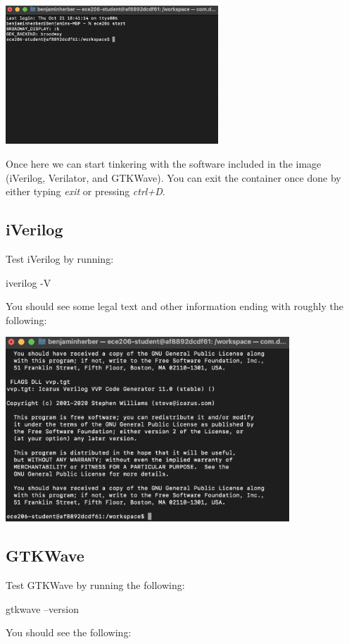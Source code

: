 \documentclass[11pt, letterpaper, titlepage, oneside]{memoir}
\begin{document}
        \begin{center}
            \includegraphics[width=0.6\textwidth]{./images/container_started.png}
        \end{center}
        
        Once here we can start tinkering with the software included in the image (iVerilog, Verilator, and GTKWave). You can exit the container once done by either typing \textit{exit} or pressing \textit{ctrl+D}.

        \subsection*{iVerilog}
            Test iVerilog by running:
            \begin{bash}
                iverilog -V
            \end{bash}
            You should see some legal text and other information ending with roughly the following:

            \begin{center}
                \includegraphics[width=0.8\textwidth]{./images/iverilog_confirmation.png}
            \end{center}

        \subsection*{GTKWave}
            Test GTKWave by running the following:
            \begin{bash}
                gtkwave --version
            \end{bash}
            You should see the following:
\end{document}
